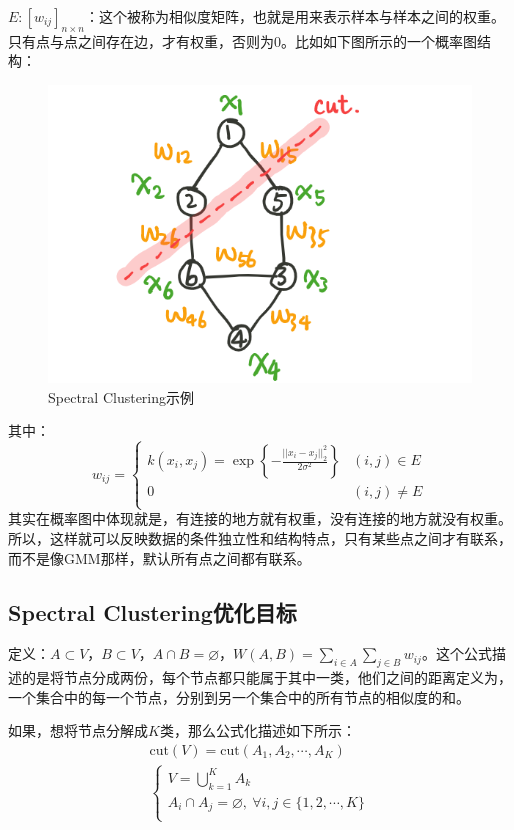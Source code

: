 \documentclass[a4paper]{article}
\begin{document}
$E:[w_{ij}]_{n\times n}$：这个被称为相似度矩阵，也就是用来表示样本与样本之间的权重。只有点与点之间存在边，才有权重，否则为0。比如如下图所示的一个概率图结构：
\begin{figure}[H]
    \centering
    \includegraphics[width=.4\textwidth]{微信图片_20200303131334.png}
    \caption{Spectral Clustering示例}
\end{figure}
其中：
$$
w_{ij} = 
\left\{
\begin{array}{ll}
      k(x_i,x_j) = \exp \left\{ -\frac{||x_i-x_j||^2_2}{2\sigma^2} \right\} &(i,j)\in E \\
      0 & (i,j)\neq E \\
\end{array}
\right.
$$
其实在概率图中体现就是，有连接的地方就有权重，没有连接的地方就没有权重。所以，这样就可以反映数据的条件独立性和结构特点，只有某些点之间才有联系，而不是像GMM那样，默认所有点之间都有联系。

\subsection{Spectral Clustering优化目标}
定义：$A\subset V$，$B\subset V$，$A \cap B=\varnothing$，$W(A,B)=\sum_{i\in A}\sum_{j\in B}w_{ij}$。这个公式描述的是将节点分成两份，每个节点都只能属于其中一类，他们之间的距离定义为，一个集合中的每一个节点，分别到另一个集合中的所有节点的相似度的和。

如果，想将节点分解成$K$类，那么公式化描述如下所示：
\begin{equation}
    \begin{split}
        & \mathrm{cut}(V) = \mathrm{cut}(A_1,A_2,\cdots,A_K) \\
        & \left\{
        \begin{array}{ll}
        V = \bigcup_{k=1}^K A_k & \\
        A_i \cap A_j = \varnothing, \ \forall i,j\in \{ 1,2,\cdots,K \}& \\
        \end{array}
\right.
    \end{split}
\end{equation}
\end{document}
